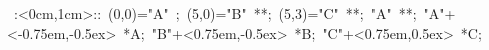 

\hbox{
\xy    <1cm,0cm>:<0cm,1cm>::
       (0,0)="A" ; (5,0)="B" **\dir{-}; 
       (5,3)="C" **\dir{-};  "A" **\dir{-};
       "A"+<-0.75em,-0.5ex> *{A};
       "B"+<0.75em,-0.5ex> *{B};
       "C"+<0.75em,0.5ex> *{C};
       \endxy}
	   
